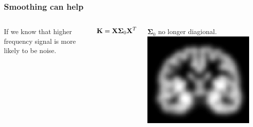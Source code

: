 \begin{frame}
\frametitle{Smoothing can help}
\begin{columns}[c]
If we know that higher frequency signal is more likely to be noise.\par
\begin{Large}
\begin{eqnarray*}
{\bf K} = {\bf X}\boldsymbol\Sigma_0{\bf X}^T
\end{eqnarray*}
\end{Large}

$\boldsymbol\Sigma_0$ no longer diagional.
\includegraphics[width=\textwidth]{brain-GM-smo}
\end{columns}
\end{frame}


%
%

